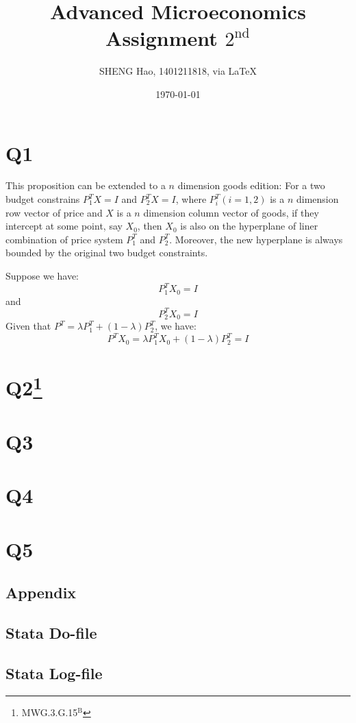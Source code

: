 \documentclass{article}
\begin{document}
\title{Advanced Microeconomics\\Assignment $2^{\text{nd}}$}
\author{{\normalsize SHENG Hao, 1401211818, via \LaTeX}}
\date{\today}

\maketitle

\def \Pr{{\rm Pr}}
\baselineskip 0.6cm
\section{Q1}

This proposition can be extended to a $n$ dimension goods edition:
For a two budget constrains $P^T_1X = I$ and $P^T_2X = I$, where $P^T_i(i=1,2)$ is a $n$ dimension row vector of price and $X$ is a $n$ dimension column vector of goods, if they intercept at some point, say $X_0$, then $X_0$ is also on the hyperplane of liner combination of price system $P^T_1$ and $P^T_2$. Moreover, the new hyperplane is always bounded by the original two budget constraints.

Suppose we have:
\begin{equation}
P^T_1X_0 = I
\end{equation}
and
\begin{equation}
P^T_2X_0 = I
\end{equation}
Given that $P^T = \lambda P^T_1 + (1-\lambda) P^T_2$, we have:
\begin{equation}
P^TX_0 = \lambda P^T_1 X_0 + (1-\lambda) P^T_2 = I
\end{equation}

\section{Q2\footnote{MWG.3.G.15$^\text{B}$}}

\section{Q3}

\section{Q4}

\section{Q5}


\newpage
\begin{appendix}
\section*{Appendix}
\subsection{Stata Do-file}
\subsection{Stata Log-file}
\end{appendix}
\end{document}
